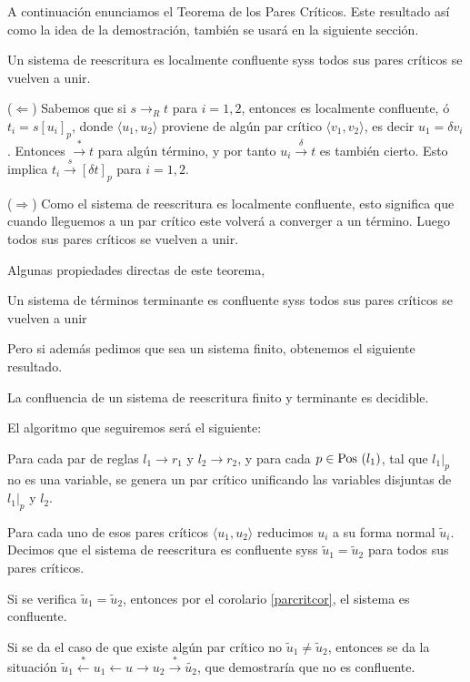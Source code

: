 
A continuación enunciamos el Teorema de los Pares Críticos. Este
resultado así como la idea de la demostración, también se usará en la
siguiente sección.
\begin{teor}
  Un sistema de reescritura es localmente confluente syss todos sus
  pares críticos se vuelven a unir.
\end{teor}

\begin{demo}
  ($\Leftarrow$) Sabemos que si $s \rightarrow_R t$ para $i = 1,2$,
  entonces es localmente confluente, ó $t_i = s[u_i]_p$, donde
  $\langle u_1, u_2 \rangle$ proviene de algún par crítico
  $\langle v_1, v_2 \rangle$, es decir $u_1 = \delta v_i$. Entonces
  $\xrightarrow{*}t$ para algún término, y por tanto
  $u_i \xrightarrow \delta t$ es también cierto. Esto implica
  $t_i \xrightarrow s[\delta t]_p$ para $i = 1,2$.

  ($\Rightarrow$) Como el sistema de reescritura es localmente
  confluente, esto significa que cuando lleguemos a un par crítico
  este volverá a converger a un término. Luego todos sus pares
  críticos se vuelven a unir.
\end{demo}

Algunas propiedades directas de este teorema,

\begin{coro}\label{parcritcor}
  Un sistema de términos terminante es confluente syss todos sus pares
  críticos se vuelven a unir
\end{coro}

Pero si además pedimos que sea un sistema finito, obtenemos el
siguiente resultado.

\begin{coro}
  La confluencia de un sistema de reescritura finito y terminante es
  decidible.
\end{coro}

\begin{demo}
  El algoritmo que seguiremos será el siguiente:

  Para cada par de reglas $l_1 \rightarrow r_1$ y
  $l_2 \rightarrow r_2$, y para cada $p \in \mbox{Pos }(l_1)$, tal que
  $l_1|_p$ no es una variable, se genera un par crítico unificando las
  variables disjuntas de $l_1|_p$ y $l_2$.

  Para cada uno de esos pares críticos $\langle u_1, u_2 \rangle$
  reducimos $u_i$ a su forma normal $\tilde{u}_i$. Decimos que el
  sistema de reescritura es confluente syss
  $\tilde{u}_1 = \tilde{u}_2$ para todos sus pares críticos.

  Si se verifica $\tilde{u}_1 = \tilde{u}_2$, entonces por el
  corolario \ref{parcritcor}, el sistema es confluente.

  Si se da el caso de que existe algún par crítico no
  $\tilde{u}_1 \not = \tilde{u}_2$, entonces se da la situación
  $\tilde{u}_1 \xleftarrow{*} u_1 \leftarrow u \rightarrow u_2
  \xrightarrow{*} \tilde{u_2}$, que demostraría que no es confluente.
\end{demo}

